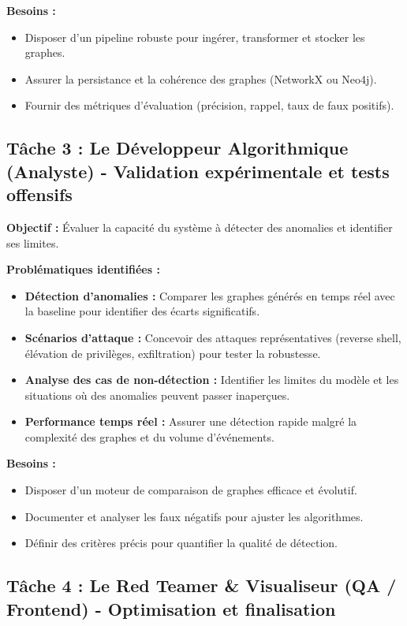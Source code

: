 \documentclass[a4paper,12pt]{article}
\begin{document}
\textbf{Besoins :} 
\begin{itemize}
    \item Disposer d’un pipeline robuste pour ingérer, transformer et stocker les graphes.
    \item Assurer la persistance et la cohérence des graphes (NetworkX ou Neo4j).
    \item Fournir des métriques d’évaluation (précision, rappel, taux de faux positifs).
\end{itemize}

\subsection{Tâche 3 : Le Développeur Algorithmique (Analyste) - Validation expérimentale et tests offensifs}

\textbf{Objectif :} Évaluer la capacité du système à détecter des anomalies et identifier ses limites.

\textbf{Problématiques identifiées :}
\begin{itemize}
    \item \textbf{Détection d’anomalies :} Comparer les graphes générés en temps réel avec la baseline pour identifier des écarts significatifs.
    \item \textbf{Scénarios d’attaque :} Concevoir des attaques représentatives (reverse shell, élévation de privilèges, exfiltration) pour tester la robustesse.
    \item \textbf{Analyse des cas de non-détection :} Identifier les limites du modèle et les situations où des anomalies peuvent passer inaperçues.
    \item \textbf{Performance temps réel :} Assurer une détection rapide malgré la complexité des graphes et du volume d’événements.
\end{itemize}

\textbf{Besoins :} 
\begin{itemize}
    \item Disposer d’un moteur de comparaison de graphes efficace et évolutif.
    \item Documenter et analyser les faux négatifs pour ajuster les algorithmes.
    \item Définir des critères précis pour quantifier la qualité de détection.
\end{itemize}

\subsection{Tâche 4 : Le Red Teamer \& Visualiseur (QA / Frontend) - Optimisation et finalisation}
\end{document}

